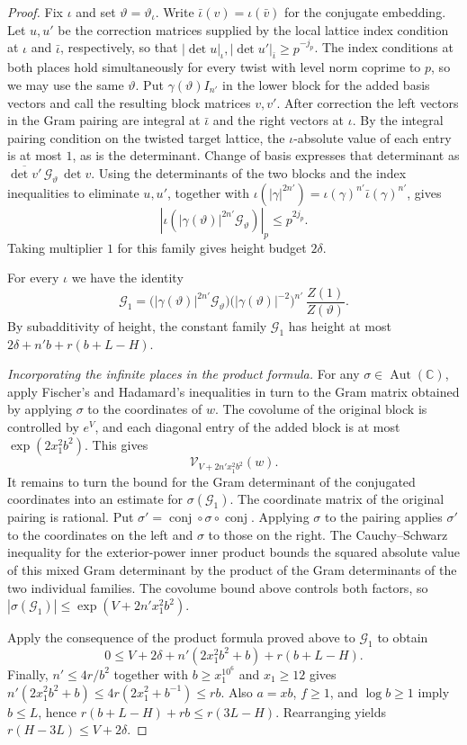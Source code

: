 \begin{proof}
Fix $\iota$ and set $\vartheta=\vartheta_\iota$. Write $\bar\iota(v)=\iota(\bar v)$ for the conjugate embedding. Let $u,u'$ be the correction matrices supplied by the local lattice index condition at $\iota$ and $\bar\iota$, respectively, so that $|\det u|_\iota,|\det u'|_{\bar\iota}\ge p^{-j_p}$. The index conditions at both places hold simultaneously for every twist with level norm coprime to $p$, so we may use the same $\vartheta$. Put $\gamma(\vartheta)I_{n'}$ in the lower block for the added basis vectors and call the resulting block matrices $v,v'$. After correction the left vectors in the Gram pairing are integral at $\bar\iota$ and the right vectors at $\iota$. By the integral pairing condition on the twisted target lattice, the $\iota$-absolute value of each entry is at most $1$, as is the determinant. Change of basis expresses that determinant as $\overline{\det v'}\,\mathcal G_\vartheta\,\det v$. Using the determinants of the two blocks and the index inequalities to eliminate $u,u'$, together with $\iota(|\gamma|^{2n'})=\iota(\gamma)^{n'}\bar\iota(\gamma)^{n'}$, gives
\[
 |\iota(|\gamma(\vartheta)|^{2n'}\mathcal G_\vartheta)|_p\le p^{2j_p}.
\]
Taking multiplier $1$ for this family gives height budget $2\delta$.

For every $\iota$ we have the identity
\[
 \mathcal G_1
 =\bigl(|\gamma(\vartheta)|^{2n'}\mathcal G_\vartheta\bigr)
  \bigl(|\gamma(\vartheta)|^{-2}\bigr)^{n'}\,\frac{Z(1)}{Z(\vartheta)} .
\]
By subadditivity of height, the constant family $\mathcal G_1$ has height at most $2\delta+n'b+r(b+L-H)$.

\emph{Incorporating the infinite places in the product formula.}
For any $\sigma\in\operatorname{Aut}(\mathbb C)$, apply Fischer's and Hadamard's inequalities in turn to the Gram matrix obtained by applying $\sigma$ to the coordinates of $w$. The covolume of the original block is controlled by $e^V$, and each diagonal entry of the added block is at most $\exp(2x_1^2b^2)$. This gives
\[
 \mathcal V_{V+2n'x_1^2b^2}(w).
\]
It remains to turn the bound for the Gram determinant of the conjugated coordinates into an estimate for $\sigma(\mathcal G_1)$. The coordinate matrix of the original pairing is rational. Put $\sigma'=\operatorname{conj}\circ\sigma\circ\operatorname{conj}$. Applying $\sigma$ to the pairing applies $\sigma'$ to the coordinates on the left and $\sigma$ to those on the right. The Cauchy--Schwarz inequality for the exterior-power inner product bounds the squared absolute value of this mixed Gram determinant by the product of the Gram determinants of the two individual families. The covolume bound above controls both factors, so $|\sigma(\mathcal G_1)|\le\exp(V+2n'x_1^2b^2)$.

Apply the consequence of the product formula proved above to $\mathcal G_1$ to obtain
\[
 0\le V+2\delta+n'(2x_1^2b^2+b)+r(b+L-H).
\]
Finally, $n'\le 4r/b^2$ together with $b\ge x_1^{10^6}$ and $x_1\ge 12$ gives $n'(2x_1^2b^2+b)\le 4r(2x_1^2+b^{-1})\le rb$. Also $a=xb$, $f\ge1$, and $\log b\ge1$ imply $b\le L$, hence $r(b+L-H)+rb\le r(3L-H)$. Rearranging yields $r(H-3L)\le V+2\delta$.
\end{proof}
